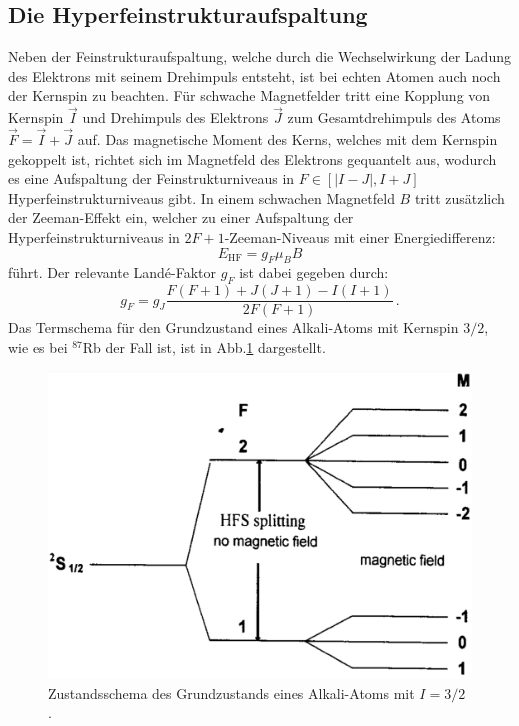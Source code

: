 \subsection{Die Hyperfeinstrukturaufspaltung}
Neben der Feinstrukturaufspaltung, welche durch die Wechselwirkung der Ladung des Elektrons mit seinem Drehimpuls entsteht, ist bei echten Atomen auch noch der Kernspin zu beachten. Für schwache Magnetfelder tritt eine Kopplung von Kernspin $\vec{I}$ und Drehimpuls des Elektrons $\vec{J}$ zum Gesamtdrehimpuls des Atoms $\vec{F}=\vec{I}+\vec{J}$ auf. Das magnetische Moment des Kerns, welches mit dem Kernspin gekoppelt ist, richtet sich im Magnetfeld des Elektrons gequantelt aus, wodurch es
eine Aufspaltung der Feinstrukturniveaus in $F \in [|I-J|,I+J]$ Hyperfeinstrukturniveaus gibt.
In einem schwachen Magnetfeld $B$ tritt zusätzlich der Zeeman-Effekt ein, welcher zu einer Aufspaltung der Hyperfeinstrukturniveaus in $2F+1$-Zeeman-Niveaus mit einer Energiedifferenz:
\begin{equation}
  E_{\text{HF}}=g_F\mu_BB
\end{equation}
führt. Der relevante Landé-Faktor $g_F$ ist dabei gegeben durch:
\begin{equation}
  g_F=g_J\frac{F(F+1)+J(J+1)-I(I+1)}{2F(F+1)}\,.
  \label{eq:gf}
\end{equation}
Das Termschema für den Grundzustand eines Alkali-Atoms mit Kernspin $3/2$, wie es bei $^{87}$Rb der Fall ist, ist in Abb.\ref{Hyperfein} dargestellt.
\begin{figure}
  \centering
  \includegraphics[scale=0.4]{Bilder/Hyperfein}
  \caption{Zustandsschema des Grundzustands eines Alkali-Atoms mit $I=3/2$ \cite{Black}.}
  \label{Hyperfein}
\end{figure}
